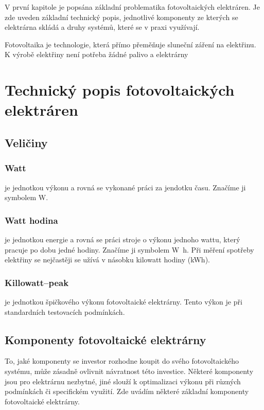 V první kapitole je popsána základní problematika fotovoltaických elektráren.
Je zde uveden základní technický popis, jednotlivé komponenty ze kterých se elektrárna skládá a druhy systémů, které se v praxi využívají.

Fotovoltaika je technologie, která přímo přeměňuje sluneční záření na elektřinu. K výrobě elektřiny není potřeba žádné palivo a elektrárny 

\section{Technický popis fotovoltaických elektráren}



\subsection{Veličiny}

\subsubsection{Watt} je jednotkou výkonu a rovná se vykonané práci za jendotku času.
Značíme ji symbolem \si{\watt}.

\subsubsection{Watt hodina} je jednotkou energie a rovná se práci stroje o výkonu jednoho wattu, který pracuje po dobu jedné hodiny.
Značíme ji symbolem \si{\watt\hour}. Při měření spotřeby elektřiny se nejčastěji se užívá v násobku kilowatt hodiny (\si{\kWh}).

\subsubsection{Killowatt--peak} je jednotkou špičkového výkonu fotovoltaické elektrárny. Tento výkon je při standardních testovacích podmínkách.


\subsection{Komponenty fotovoltaické elektrárny}
To, jaké komponenty se investor rozhodne koupit do svého fotovoltaického systému, může zásadně ovlivnit návratnost této investice.
Některé komponenty jsou pro elektrárnu nezbytné, jiné slouží k optimalizaci výkonu při různých podmínkách či specifickém využití.
Zde uvádím některé základní komponenty fotovoltaické elektrárny.


